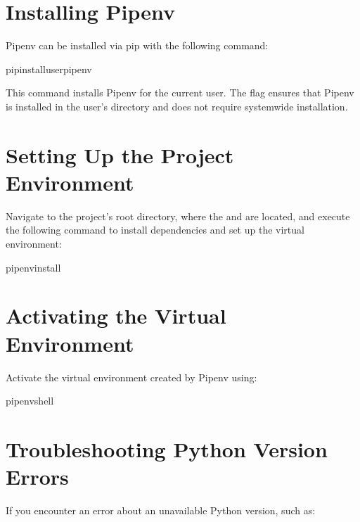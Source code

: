 \documentclass[letterpaper,10pt,english]{sphinxmanual}
\begin{document}
\section{Installing Pipenv}
\label{\detokenize{setup_guide:installing-pipenv}}
\sphinxAtStartPar
Pipenv can be installed via pip with the following command:

\begin{sphinxVerbatim}[commandchars=\\\{\}]
pipinstall\PYGZhy{}\PYGZhy{}userpipenv
\end{sphinxVerbatim}

\sphinxAtStartPar
This command installs Pipenv for the current user. The  flag ensures that Pipenv is installed in the user’s directory and does not require system\sphinxhyphen{}wide installation.


\section{Setting Up the Project Environment}
\label{\detokenize{setup_guide:setting-up-the-project-environment}}
\sphinxAtStartPar
Navigate to the project’s root directory, where the  and  are located, and execute the following command to install dependencies and set up the virtual environment:

\begin{sphinxVerbatim}[commandchars=\\\{\}]
pipenvinstall
\end{sphinxVerbatim}


\section{Activating the Virtual Environment}
\label{\detokenize{setup_guide:activating-the-virtual-environment}}
\sphinxAtStartPar
Activate the virtual environment created by Pipenv using:

\begin{sphinxVerbatim}[commandchars=\\\{\}]
pipenvshell
\end{sphinxVerbatim}


\section{Troubleshooting Python Version Errors}
\label{\detokenize{setup_guide:troubleshooting-python-version-errors}}
\sphinxAtStartPar
If you encounter an error about an unavailable Python version, such as:
\end{document}
